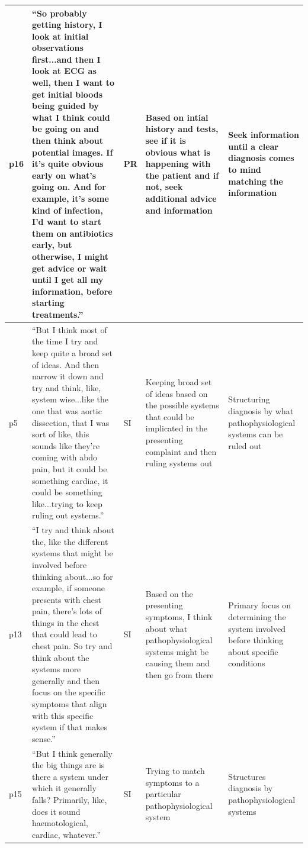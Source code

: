 \documentclass[a4paper, nobind]{templates/ociamthesis}
\begin{document}
\begin{longtable}[t]{>{\raggedright\arraybackslash}p{5em}|>{\raggedright\arraybackslash}p{14em}|>{\raggedright\arraybackslash}p{3em}|>{\raggedright\arraybackslash}p{6em}|>{\raggedright\arraybackslash}p{6em}}
p16 & “So probably getting history, I look at initial observations first...and then I look at ECG as well, then I want to get initial bloods being guided by what I think could be going on and then think about potential images. If it's quite obvious early on what's going on. And for example, it's some kind of infection, I'd want to start them on antibiotics early, but otherwise, I might get advice or wait until I get all my information, before starting treatments.” & PR & Based on intial history and tests, see if it is obvious what is happening with the patient and if not, seek additional advice and information & Seek information until a clear diagnosis comes to mind matching the information\\
\hline
p5 & “But I think most of the time I try and keep quite a broad set of ideas. And then narrow it down and try and think, like, system wise...like the one that was aortic dissection, that I was sort of like, this sounds like they're coming with abdo pain, but it could be something cardiac, it could be something like...trying to keep ruling out systems.” & SI & Keeping broad set of ideas based on the possible systems that could be implicated in the presenting complaint and then ruling systems out & Structuring diagnosis by what pathophysiological systems can be ruled out\\
\hline
p13 & “I try and think about the, like the different systems that might be involved before thinking about...so for example, if someone presents with chest pain, there's lots of things in the chest that could lead to chest pain. So try and think about the systems more generally and then focus on the specific symptoms that align with this specific system if that makes sense.” & SI & Based on the presenting symptoms, I think about what pathophysiological systems might be causing them and then go from there & Primary focus on determining the system involved before thinking about specific conditions\\
\hline
p15 & “But I think generally the big things are is there a system under which it generally falls? Primarily, like, does it sound haemotological, cardiac, whatever.” & SI & Trying to match symptoms to a particular pathophysiological system & Structures diagnosis by pathophysiological systems\\
\hline
\end{longtable}

\hfill\break
\end{document}
